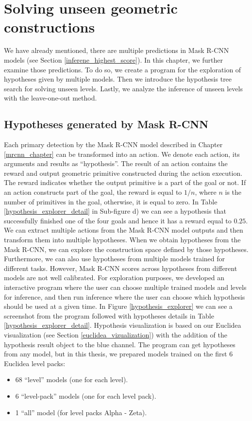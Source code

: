 \chapter{Solving unseen geometric constructions}
\label{chapter_unseen_levels}
We have already mentioned, there are multiple predictions in Mask {R-CNN} models (see Section \ref{inferene_highest_score}). In this chapter, we further examine those predictions. To do so, we create a program for the exploration of hypotheses given by multiple models. Then we introduce the hypothesis tree search for solving unseen levels. Lastly, we analyze the inference of unseen levels with the leave-one-out method.
\section{Hypotheses generated by Mask {R-CNN}}
Each primary detection by the Mask {R-CNN} model described in Chapter \ref{mrcnn_chapter} can be transformed into an action. We denote each action, its arguments and results as ``hypothesis''. The result of an action contains the reward and output geometric primitive constructed during the action execution. The reward indicates whether the output primitive is a part of the goal or not. If an action constructs part of the goal, the reward is equal to $1/n$, where $n$ is the number of primitives in the goal, otherwise, it is equal to zero. In Table \ref{hypothesis_explorer_detail} in Sub-figure d) we can see a hypothesis that successfully finished one of the four goals and hence it has a reward equal to $0.25$.  We  can extract multiple actions from the Mask R-CNN model outputs and then transform them into multiple hypotheses. 
\newline \newline
When we obtain hypotheses from the Mask {R-CNN}, we can explore the construction space defined by those hypotheses. Furthermore, we can also use hypotheses from multiple models trained for different tasks. However, Mask {R-CNN} scores across hypotheses from different models are not well calibrated. For exploration purposes, we developed an interactive program where the user can choose multiple trained models and levels for inference, and then run inference where the user can choose which hypothesis should be used at a given time. In Figure \ref{hypothesis_explorer} we can see a screenshot from the program followed with hypotheses details in Table \ref{hypothesis_explorer_detail}. Hypothesis visualization is based on our Euclidea visualization (see Section \ref{euclidea_vizualization}) with the addition of the hypothesis result object to the blue channel. The program can get hypotheses from any model, but in this thesis, we prepared models trained on the first 6 Euclidea level packs:
\begin{itemize}
\item 68 ``level'' models (one for each level). 
\item 6 ``level-pack'' models (one for each level pack).
\item 1 ``all'' model (for level packs Alpha - Zeta).
\end{itemize}

